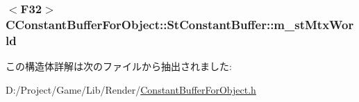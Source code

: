 \subsubsection[{m\+\_\+st\+Mtx\+World}]{$<$F32$>$ C\+Constant\+Buffer\+For\+Object\+::\+St\+Constant\+Buffer\+::m\+\_\+st\+Mtx\+World}\label{struct_c_constant_buffer_for_object_1_1_st_constant_buffer_ad9f4abda99ca8f74484d3b965dea439b}


この構造体詳解は次のファイルから抽出されました\+:\begin{DoxyCompactItemize}
\item 
D\+:/\+Project/\+Game/\+Lib/\+Render/\hyperlink{_constant_buffer_for_object_8h}{Constant\+Buffer\+For\+Object.\+h}\end{DoxyCompactItemize}
